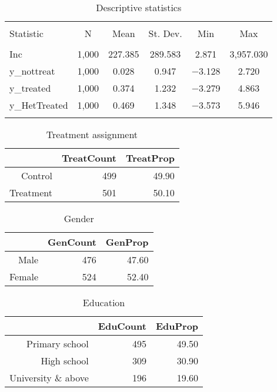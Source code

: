 \documentclass[11pt, a4paper]{article}\usepackage[]{graphicx}\usepackage[]{color}
\begin{document}
\begin{table}[!htbp] \centering 
  \caption{Descriptive statistics} 
  \label{} 
\begin{tabular}{@{\extracolsep{5pt}}lccccc} 
\\[-1.8ex]\hline 
\hline \\[-1.8ex] 
Statistic & \multicolumn{1}{c}{N} & \multicolumn{1}{c}{Mean} & \multicolumn{1}{c}{St. Dev.} & \multicolumn{1}{c}{Min} & \multicolumn{1}{c}{Max} \\ 
\hline \\[-1.8ex] 
Inc & 1,000 & 227.385 & 289.583 & 2.871 & 3,957.030 \\ 
y\_nottreat & 1,000 & 0.028 & 0.947 & $-$3.128 & 2.720 \\ 
y\_treated & 1,000 & 0.374 & 1.232 & $-$3.279 & 4.863 \\ 
y\_HetTreated & 1,000 & 0.469 & 1.348 & $-$3.573 & 5.946 \\ 
\hline \\[-1.8ex] 
\end{tabular} 
\end{table} 
\begin{table}[ht]
\centering
\caption{Treatment assignment} 
\begin{tabular}{rrr}
  \hline
 & TreatCount & TreatProp \\ 
  \hline
Control & 499 & 49.90 \\ 
  Treatment & 501 & 50.10 \\ 
   \hline
\end{tabular}
\end{table}
\begin{table}[ht]
\centering
\caption{Gender} 
\begin{tabular}{rrr}
  \hline
 & GenCount & GenProp \\ 
  \hline
Male & 476 & 47.60 \\ 
  Female & 524 & 52.40 \\ 
   \hline
\end{tabular}
\end{table}
\begin{table}[ht]
\centering
\caption{Education} 
\begin{tabular}{rrr}
  \hline
 & EduCount & EduProp \\ 
  \hline
Primary school & 495 & 49.50 \\ 
  High school & 309 & 30.90 \\ 
  University \& above & 196 & 19.60 \\ 
   \hline
\end{tabular}
\end{table}
\end{document}
